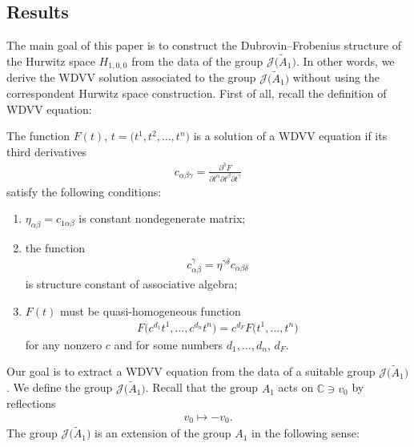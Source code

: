 \documentclass[10pt,a4paper]{amsart}
\numberwithin{equation}{section}
\newcommand{\Ja}{\mathcal{J}}
\begin{document}
\subsection{Results}%

The main goal of this paper is to construct the Dubrovin--Frobenius structure of the Hurwitz space $H_{1,0,0}$ from the data of the group $\Ja\big(\tilde A_1\big)$. In other words, we derive the WDVV solution associated to the group $\Ja\big(\tilde A_1\big)$ without using the correspondent Hurwitz space construction. First of all, recall the definition of WDVV equation:
 \begin{Definition}
The function $F(t)$, $t=\big(t^1,t^2,\dots,t^n\big)$ is a solution of a WDVV equation if its third derivatives
\begin{gather}\label{freeenergy}
c_{\alpha\beta\gamma}=\frac{\partial^3F}{\partial t^{\alpha}\partial t^{\beta}\partial t^{\gamma}}
\end{gather}
satisfy the following conditions:

\begin{enumerate}\itemsep=0pt
\item[1)] $\eta_{\alpha\beta}=c_{1\alpha\beta}$ is constant nondegenerate matrix;
\item[2)] the function
\begin{gather*}
c_{\alpha\beta}^{\gamma}=\eta^{\gamma\delta}c_{\alpha\beta\delta}
\end{gather*}
is structure constant of associative algebra;
\item[3)] $F(t)$ must be quasi-homogeneous function
\begin{gather*}
F\big(c^{d_1}t^1,\dots,c^{d_n}t^n\big)=c^{d_F}F\big(t^1,\dots,t^n\big)
\end{gather*}
for any nonzero $c$ and for some numbers $d_1, \dots , d_n$, $d_F$.
\end{enumerate}
\end{Definition}
Our goal is to extract a WDVV equation from the data of a suitable group $\Ja\big(\tilde A_1\big)$. We define the group $\Ja\big(\tilde A_1\big)$. Recall that the group $A_1$ acts on $\mathbb{C}\ni v_0$ by reflections
 \begin{gather*}
 v_0\mapsto -v_0.
 \end{gather*}
The group $\Ja\big(\tilde A_1\big)$ is an extension of the group $A_1$ in the following sense:
\end{document}
